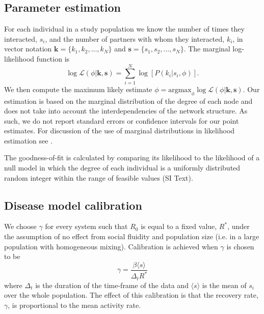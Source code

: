\documentclass[twocolumn,8pt]{article}
\begin{document}
\subsection{Parameter estimation}
\label{estimation}
For each individual in a study population we know the number of times they interacted, $s_{i}$, and the number of partners with whom they interacted, $k_{i}$, in vector notation $\textbf{k}=\{k_{1},k_{2},...,k_{N}\}$ and $\textbf{s}=\{s_{1},s_{2},...,s_{N}\}$. The marginal log-likelihood function is
\begin{equation}
\log \mathcal{L}(\phi|\textbf{k},\textbf{s})=\sum_{i=1}^{N}\log[P(k_{i}|s_{i},\phi)].
\end{equation}
We then compute the maximum likely estimate $\phi=\text{argmax}_{\phi}\log \mathcal{L}(\phi|\textbf{k},\textbf{s})$. Our estimation is based on the marginal distribution of the degree of each node and does not take into account the interdependencies of the network structure. As such, we do not report standard errors or confidence intervals for our point estimates. For discussion of the use of marginal distributions in likelihood estimation see \cite{varin2011overview}.

The goodness-of-fit is calculated by comparing its likelihood to the likelihood of a null model in which the degree of each individual is a uniformly distributed random integer within the range of feasible values (SI Text).

\subsection{Disease model calibration}
\label{disease_calib}
We choose $\gamma$ for every system such that $R_{0}$ is equal to a fixed value, $R^{*}$, under the assumption of no effect from social fluidity and population size (i.e. in a large population with homogeneous mixing). Calibration is achieved when $\gamma$ is chosen to be  
\begin{equation}
\label{calibration}
\gamma=\frac{\beta\langle s\rangle}{ \Delta_{t} R^{*}}
\end{equation}
where $\Delta_{t}$ is the duration of the time-frame of the data and $\langle s\rangle$ is the mean of $s_{i}$ over the whole population. The effect of this calibration is that the recovery rate, $\gamma$, is proportional to the mean activity rate.
\end{document}
